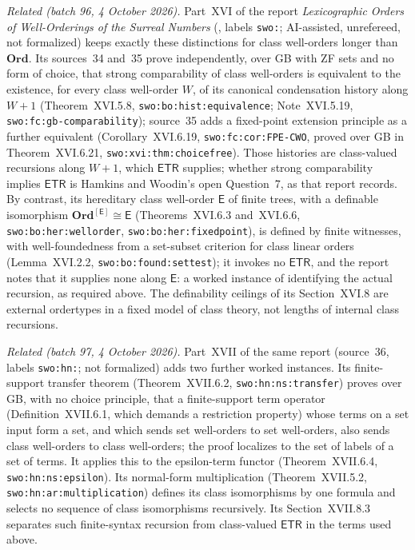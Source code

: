 \documentclass[11pt,letterpaper]{article}
\numberwithin{equation}{section}
\theoremstyle{definition}
\theoremstyle{remark}
\newcommand{\Ord}{\mathbf{Ord}}
\newcommand{\ETR}{\mathsf{ETR}}
\begin{document}
\emph{Related (batch 96, 4 October 2026).} Part~XVI of the report
\emph{Lexicographic Orders of Well-Orderings of the Surreal Numbers}
(,
labels \texttt{swo:}; AI-assisted, unrefereed, not formalized) keeps exactly
these distinctions for class well-orders longer than $\Ord$. Its sources~34
and~35 prove independently, over GB with ZF sets and no form of choice, that
strong comparability of class well-orders is equivalent to the existence, for
every class well-order $W$, of its canonical condensation history along $W+1$
(Theorem~XVI.5.8, \texttt{swo:bo:hist:equivalence}; Note~XVI.5.19,
\texttt{swo:fc:gb-comparability}); source~35 adds a fixed-point extension
principle as a further equivalent (Corollary~XVI.6.19,
\texttt{swo:fc:cor:FPE-CWO}, proved over GB in Theorem~XVI.6.21,
\texttt{swo:xvi:thm:choicefree}). Those histories are class-valued recursions
along $W+1$, which $\ETR$ supplies; whether strong comparability implies $\ETR$
is Hamkins and Woodin's open Question~7, as that report records. By contrast,
its hereditary class well-order $\mathsf E$ of finite trees, with a definable
isomorphism $\Ord^{[\mathsf E]}\cong\mathsf E$ (Theorems~XVI.6.3 and~XVI.6.6,
\texttt{swo:bo:her:wellorder}, \texttt{swo:bo:her:fixedpoint}), is defined by
finite witnesses, with well-foundedness from a set-subset criterion for class
linear orders (Lemma~XVI.2.2, \texttt{swo:bo:found:settest}); it invokes no
$\ETR$, and the report notes that it supplies none along $\mathsf E$: a worked
instance of identifying the actual recursion, as required above. The
definability ceilings of its Section~XVI.8 are external ordertypes in a fixed
model of class theory, not lengths of internal class recursions.

\emph{Related (batch 97, 4 October 2026).} Part~XVII of the same report
(source~36, labels \texttt{swo:hn:}; not formalized) adds two further worked
instances. Its finite-support transfer theorem (Theorem~XVII.6.2,
\texttt{swo:hn:ns:transfer}) proves over GB, with no choice principle, that a
finite-support term operator (Definition~XVII.6.1, which demands a restriction
property) whose terms on a set input form a set, and which sends set
well-orders to set well-orders, also sends class well-orders to class
well-orders; the proof localizes to the set of labels of a set of terms. It
applies this to the epsilon-term functor (Theorem~XVII.6.4,
\texttt{swo:hn:ns:epsilon}). Its normal-form multiplication
(Theorem~XVII.5.2, \texttt{swo:hn:ar:multiplication}) defines its class
isomorphisms by one formula and selects no sequence of class isomorphisms
recursively. Its Section~XVII.8.3 separates such finite-syntax recursion from
class-valued $\ETR$ in the terms used above.
\end{document}
